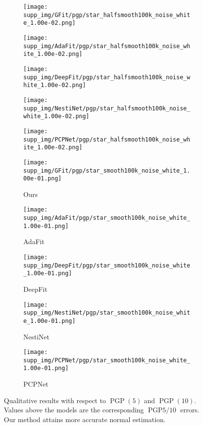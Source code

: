 \documentclass[runningheads]{llncs}
\begin{document}
\begin{figure*}
\begin{subfigure}{0.15\linewidth}
		\centering
		\texttt{[image: supp\_img/GFit/pgp/star\_halfsmooth100k\_noise\_white\_1.00e-02.png]}
\end{subfigure}
	\hspace{0.1cm}
	\begin{subfigure}{0.15\linewidth}
		\centering
		\texttt{[image: supp\_img/AdaFit/pgp/star\_halfsmooth100k\_noise\_white\_1.00e-02.png]}
\end{subfigure}
	\hspace{0.1cm}
	\begin{subfigure}{0.17\linewidth}
		\centering
		\texttt{[image: supp\_img/DeepFit/pgp/star\_halfsmooth100k\_noise\_white\_1.00e-02.png]}
\end{subfigure}
	\hspace{0.1cm}
	\begin{subfigure}{0.17\linewidth}
		\centering
		\texttt{[image: supp\_img/NestiNet/pgp/star\_halfsmooth100k\_noise\_white\_1.00e-02.png]}
\end{subfigure}
	\hspace{0.1cm}
	\begin{subfigure}{0.17\linewidth}
		\centering
		\texttt{[image: supp\_img/PCPNet/pgp/star\_halfsmooth100k\_noise\_white\_1.00e-02.png]}
\end{subfigure}
	
\begin{subfigure}{0.15\linewidth}
		\centering
		\texttt{[image: supp\_img/GFit/pgp/star\_smooth100k\_noise\_white\_1.00e-01.png]}
		\caption{Ours}
	\end{subfigure}
	\hspace{0.1cm}
	\begin{subfigure}{0.15\linewidth}
		\centering
		\texttt{[image: supp\_img/AdaFit/pgp/star\_smooth100k\_noise\_white\_1.00e-01.png]}
		\caption{AdaFit}
	\end{subfigure}
	\hspace{0.1cm}
	\begin{subfigure}{0.17\linewidth}
		\centering
		\texttt{[image: supp\_img/DeepFit/pgp/star\_smooth100k\_noise\_white\_1.00e-01.png]}
		\caption{DeepFit}
	\end{subfigure}
	\hspace{0.1cm}
	\begin{subfigure}{0.17\linewidth}
		\centering
		\texttt{[image: supp\_img/NestiNet/pgp/star\_smooth100k\_noise\_white\_1.00e-01.png]}
		\caption{NestiNet}
	\end{subfigure}
	\hspace{0.1cm}
	\begin{subfigure}{0.17\linewidth}
		\centering
		\texttt{[image: supp\_img/PCPNet/pgp/star\_smooth100k\_noise\_white\_1.00e-01.png]}
		\caption{PCPNet}
	\end{subfigure}
\caption{Qualitative results with respect to $\operatorname{PGP}(5)$ and $\operatorname{PGP}(10)$. Values above the models are the corresponding $\operatorname{PGP5/10}$ errors. Our method attains more accurate normal estimation.
	}
	\label{fig:quali4}
\end{figure*}

 
\end{document}

